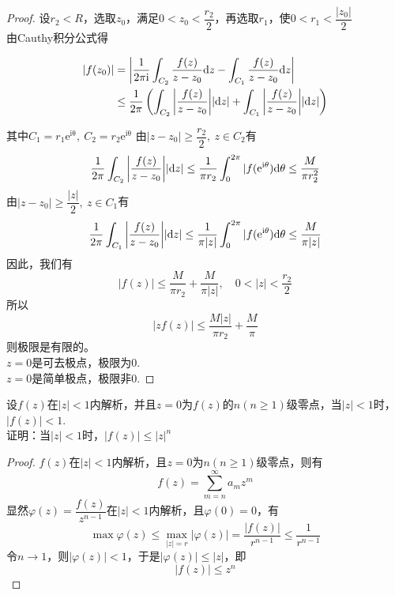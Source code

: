 \begin{proof}
    
    设$r_2 < R$，选取$z_0$，满足$0 < z_0 < \dfrac{r_2}{2}$，再选取$r_1$，使$0 < r_1 < \dfrac{|z_0|}{2}$\\
    由\textup{Cauthy}积分公式得

    \begin{align*}
        |f(z_0)| & = \left| \dfrac{1}{2\mathrm{\pi i}} \int_{C_2}{\dfrac{f(z)}{z-z_0}}\mathrm{d} z - \int_{C_1}{\dfrac{f(z)}{z-z_0}}\mathrm{d} z \right|\\
        & \leq \dfrac{1}{2 \pi} \left(\int_{C_2}{\left|\dfrac{f(z)}{z-z_0}\right|}|\mathrm{d} z| + \int_{C_1}{\left|\dfrac{f(z)}{z-z_0}\right|}|\mathrm{d} z|\right)
    \end{align*}

    其中$C_1 = r_1\mathrm{e^{i\theta}},\ C_2 = r_2\mathrm{e^{i\theta}}$
    由$|z-z_0| \geq \dfrac{r_2}{2},\ z \in C_2$有
    $$ \dfrac{1}{2 \pi} \int_{C_2}{\left| \dfrac{f(z)}{z-z_0}\right|}|\mathrm{d} z| \leq \dfrac{1}{ \pi r_2}\int_{0}^{2 \pi}{|f(\mathrm{e}^{\mathrm{i}\theta})}\mathrm{d} \theta \leq \dfrac{M}{ \pi r_2^2}$$
    由$|z-z_0| \geq \dfrac{|z|}{2},\ z \in C_1$有
    $$ \dfrac{1}{2 \pi} \int_{C_1}{\left| \dfrac{f(z)}{z-z_0}\right|}|\mathrm{d} z| \leq \dfrac{1}{ \pi|z|}\int_{0}^{2 \pi}{|f(\mathrm{e}^{\mathrm{i}\theta})}\mathrm{d} \theta \leq \dfrac{M}{ \pi|z|}$$
    因此，我们有
    $$|f(z)| \leq \dfrac{M}{ \pi r_2} + \dfrac{M}{ \pi|z|},\quad 0 < |z| < \dfrac{r_2}{2}$$
    所以$$|zf(z)| \leq \dfrac{M|z|}{ \pi r_2} + \dfrac{M}{\pi}$$
    则极限是有限的。\\
    $z=0$是可去极点，极限为$0$.\\
    $z=0$是简单极点，极限非$0$.

\end{proof}

\begin{proposition}

    设$f(z)$在$|z| < 1 $内解析，并且$z = 0$为$f(z)$的$n(n \geq 1)$级零点，当$|z|<1$时，$|f(z)| < 1$.\\
    证明：当$|z|<1$时，$|f(z)| \leq |z|^n$

\end{proposition}

\begin{proof}
    
    $f(z)$在$|z|<1$内解析，且$z = 0$为$n(n \geq 1)$级零点，则有
    $$f(z) = \sum_{m = n}^{\infty}{a_mz^m}$$
    显然$\varphi(z) = \dfrac{f(z)}{z^{n-1}}$在$|z|<1$内解析，且$\varphi(0) = 0$，有
    $$ \max\varphi(z) \leq \max_{|z| = r}|\varphi(z)| = \dfrac{|f(z)|}{r^{n-1}} \leq \dfrac{1}{r^{n-1}} $$
    令$n \to 1$，则$|\varphi(z)| < 1$，于是$|\varphi(z)| \leq |z|$，即
    $$|f(z)| \leq z^n$$

\end{proof}

